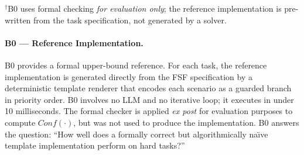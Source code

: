 \begin{table}[H]
  \caption{Compared methods and their component configurations.
           Formal = formal check; Guard = pattern guard; Repair = repair loop.}
  \label{tab:modes}
  \centering
  \par\smallskip
  \raggedright\footnotesize $^\dagger$B0 uses formal checking \emph{for evaluation only};
  the reference implementation is pre-written from the task specification, not
  generated by a solver.
\end{table}

\paragraph{B0 --- Reference Implementation.}
B0 provides a formal upper-bound reference.  For each task, the reference
implementation is generated directly from the FSF specification by a deterministic
template renderer that encodes each scenario as a guarded branch in priority order.
B0 involves no LLM and no iterative loop; it executes in under 10 milliseconds.
The formal checker is applied \emph{ex post} for evaluation purposes to compute
$\mathit{Conf}(\cdot)$, but was not used to produce the implementation.  B0 answers
the question: ``How well does a formally correct but algorithmically na\"{\i}ve
template implementation perform on hard tasks?''

